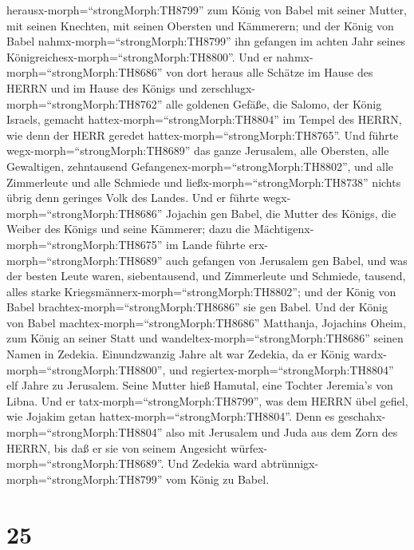 herausx-morph=``strongMorph:TH8799'' zum König von Babel mit seiner
Mutter, mit seinen Knechten, mit seinen Obersten und Kämmerern; und der
König von Babel nahmx-morph=``strongMorph:TH8799'' ihn gefangen im
achten Jahr seines Königreichesx-morph=``strongMorph:TH8800''.
 Und er nahmx-morph=``strongMorph:TH8686'' von dort heraus
alle Schätze im Hause des HERRN und im Hause des Königs und
zerschlugx-morph=``strongMorph:TH8762'' alle goldenen Gefäße, die
Salomo, der König Israels, gemacht hattex-morph=``strongMorph:TH8804''
im Tempel des HERRN, wie denn der HERR geredet
hattex-morph=``strongMorph:TH8765''.  Und führte
wegx-morph=``strongMorph:TH8689'' das ganze Jerusalem, alle Obersten,
alle Gewaltigen, zehntausend Gefangenex-morph=``strongMorph:TH8802'',
und alle Zimmerleute und alle Schmiede und
ließx-morph=``strongMorph:TH8738'' nichts übrig denn geringes Volk des
Landes.  Und er führte wegx-morph=``strongMorph:TH8686''
Jojachin gen Babel, die Mutter des Königs, die Weiber des Königs und
seine Kämmerer; dazu die Mächtigenx-morph=``strongMorph:TH8675'' im
Lande führte erx-morph=``strongMorph:TH8689'' auch gefangen von
Jerusalem gen Babel,  und was der besten Leute waren,
siebentausend, und Zimmerleute und Schmiede, tausend, alles starke
Kriegsmännerx-morph=``strongMorph:TH8802''; und der König von Babel
brachtex-morph=``strongMorph:TH8686'' sie gen Babel.  Und
der König von Babel machtex-morph=``strongMorph:TH8686'' Matthanja,
Jojachins Oheim, zum König an seiner Statt und
wandeltex-morph=``strongMorph:TH8686'' seinen Namen in Zedekia.
 Einundzwanzig Jahre alt war Zedekia, da er König
wardx-morph=``strongMorph:TH8800'', und
regiertex-morph=``strongMorph:TH8804'' elf Jahre zu Jerusalem. Seine
Mutter hieß Hamutal, eine Tochter Jeremia's von Libna.  Und
er tatx-morph=``strongMorph:TH8799'', was dem HERRN übel gefiel, wie
Jojakim getan hattex-morph=``strongMorph:TH8804''.  Denn es
geschahx-morph=``strongMorph:TH8804'' also mit Jerusalem und Juda aus
dem Zorn des HERRN, bis daß er sie von seinem Angesicht
würfex-morph=``strongMorph:TH8689''. Und Zedekia ward
abtrünnigx-morph=``strongMorph:TH8799'' vom König zu Babel.

\hypertarget{section-24}{%
\section{25}\label{section-24}}

